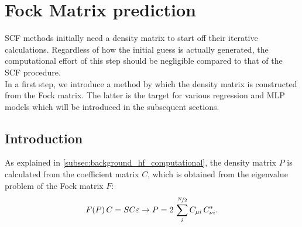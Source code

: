 \chapter{Fock Matrix prediction}
\label{chap:fock_matrix_predictions}
SCF methods initially need a density matrix to start off their iterative calculations. Regardless of how the initial guess is actually generated, the computational effort of this step should be negligible compared to that of the SCF procedure.\\
In a first step, we introduce a method by which the density matrix is constructed from the Fock matrix. The latter is the target for various regression and MLP models which will be introduced in the subsequent sections.

\section{Introduction}
\label{sec:Fock_mathcalrix_prediction_intro}
As explained in \autoref{subsec:background_hf_computational}, the density matrix $P$ is calculated from the coefficient matrix $C$, which is obtained from the eigenvalue problem of the Fock matrix $F$:
\begin{equation}
    \label{eq:density_reconstruction_from_fock}
    F(P)\,C = SC\varepsilon \rightarrow P = 2\,\sum_{i}^{\nicefrac{N}{2}} C_{\mu i}\,C^*_{\nu i}. %
\end{equation}
